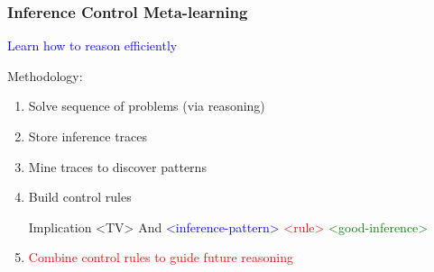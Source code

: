 \documentclass{beamer}
\begin{document}
\begin{frame}[fragile]
  \frametitle{Inference Control Meta-learning}
  \begin{center}\textcolor{blue}{Learn how to reason efficiently}\end{center}

  \pause

  Methodology:
  \begin{enumerate}
  \item<+-> Solve sequence of problems (via reasoning)
  \item<+-> Store inference traces
  \item<+-> Mine traces to discover patterns
  \item<+-> Build control rules
{\small
\begin{semiverbatim}
  Implication <TV>
    And
      \textcolor{blue}{<inference-pattern>}
      \textcolor{red}{<rule>}
    \textcolor{green}{<good-inference>}
\end{semiverbatim}
}  
  \item<+-> \textcolor{red}{Combine control rules to guide future
      reasoning}
  \end{enumerate}
\end{frame}
\end{document}
